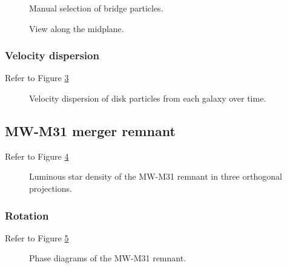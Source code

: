 \documentclass[twocolumn]{aastex63}
\newcommand{\todo}{\color{red}{TODO}\color{black}\hspace{2mm}}
\begin{document}
\begin{figure}[ht!]
	\caption{Manual selection of bridge particles.
		\label{fig:bridge}}
\end{figure}

\begin{figure}[htb!]
	\caption{View along the midplane.
		\label{fig:bridge2}}
\end{figure}


\subsubsection{Velocity dispersion}

Refer to Figure \ref{fig:vel_disp}

\begin{figure}[htb!]
	\caption{Velocity dispersion of disk particles from each galaxy over time.
	\label{fig:vel_disp}}
\end{figure}

\subsection{MW-M31 merger remnant}

\todo{shape - how to get principal axes? boxiness?}

Refer to Figure \ref{fig:rem_shape}

\begin{figure}[htb!]
	\caption{Luminous star density of the MW-M31 remnant in three orthogonal projections.
	\label{fig:rem_shape}}
\end{figure}


\subsubsection{Rotation}

\todo{phase diagram}

Refer to Figure \ref{fig:rem_phase}

\begin{figure}[htb!]
	\caption{Phase diagrams of the MW-M31 remnant.
	\label{fig:rem_phase}}
\end{figure}

\todo{alignment between particles of different origin?}



{}

\end{document}
